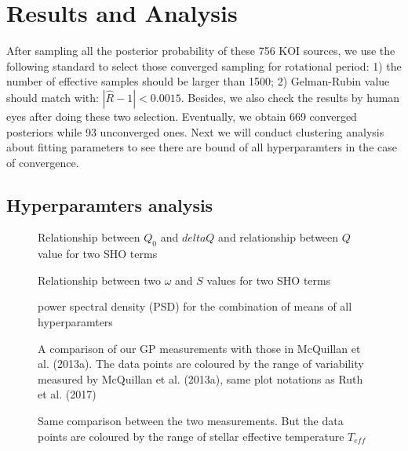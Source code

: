 \documentclass{aastex62}
\begin{document}
\section{Results and Analysis}
After sampling all the posterior probability of these 756 KOI sources, we use the following standard to select those converged sampling for rotational period: 1) the number of effective samples should be larger than 1500; 2) Gelman-Rubin value should match with: $|\hat{R}-1|<0.0015$. Besides, we also check the results by human eyes after doing these two selection. Eventually, we obtain 669 converged posteriors while 93 unconverged ones. Next we will conduct clustering analysis about fitting parameters to see there are bound of all hyperparamters in the case of convergence.
\subsection{Hyperparamters analysis}

\begin{figure}
\caption{Relationship between $Q_0$ and $deltaQ$ and relationship between $Q$ value for two SHO terms\label{fig:f1}}
\end{figure}

\begin{figure}
\caption{Relationship between two $\omega$ and $S$ values for two SHO terms\label{fig:f2}}
\end{figure}

\begin{figure}
\caption{power spectral density (PSD) for the combination of means of all hyperparamters\label{fig:f3}}
\end{figure}

\begin{figure}
\caption{A comparison of our GP measurements with those in McQuillan et al. (2013a). The data points are coloured by the range of variability measured by McQuillan et al. (2013a), same plot notations as Ruth et al. (2017)\label{fig:f4}}
\end{figure}

\begin{figure}
\caption{Same comparison between the two measurements. But the data points are coloured by the range of stellar effective temperature $T_{eff}$\label{fig:f5}}
\end{figure}
\end{document}
